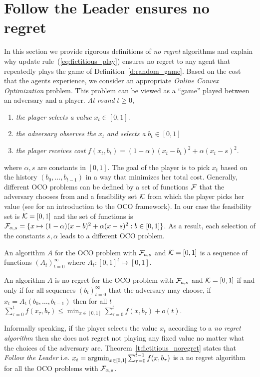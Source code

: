 \section{Follow the Leader ensures no regret}\label{s:fictitious_noregret}

In this section we provide rigorous definitions of \emph{no regret} algorithms
and explain why update rule~(\ref{eq:fictitious_play}) ensures
no regret to any agent that repeatedly plays the game of
Definition~\ref{d:random_game}.
Based on the cost that the agents experience,
we consider an appropriate \emph{Online Convex Optimization} problem.
This problem can be viewed as a \enquote{game} played between an
adversary and a player. \emph{At round }$t\geq 0$,
\begin{enumerate}
  \item \emph{the player selects a value }$x_t \in [0,1]$.
  \item \emph{the adversary observes the }$x_t$ \emph{and selects a} $b_t \in [0,1]$
  \item \emph{the player receives cost} $f(x_t,b_t)=(1-\alpha)(x_t-b_t)^2 + \alpha(x_t -s)^2$.
\end{enumerate}
where $\alpha,s$ are constants in $[0,1]$. The goal of
the player is to pick $x_t$ based on the history
$(b_0,\ldots,b_{t-1})$ in a way that minimizes her total cost.
Generally, different OCO problems can be defined by a set of functions
$\mathcal{F}$ that the adversary chooses from and a feasibility
set $\mathcal{K}$ from which the player picks her value (see \cite{Haz16}
for an introduction to the OCO framework).
In our case the feasibility set is $\mathcal{K}=[0,1]$ and the set of functions
is
$\mathcal{F}_{\alpha,s} = \{x \mapsto (1-\alpha)(x-b)^2 + \alpha(x -s)^2 : b \in [0,1]\}$.
As a result, each selection of the
constants $s,\alpha$ leads to a different OCO problem.

\begin{definition}\label{d:OCO_algo}
An algorithm $A$ for the OCO problem with $\mathcal{F}_{a,s}$ and
$\mathcal{K}=[0,1]$ is a sequence of functions $(A_t)_{t=0}^\infty$ where $A_t:[0,1]^t \mapsto [0,1]$.
\end{definition}

\begin{definition}\label{d:no_regret_algo}
An algorithm $A$ is no regret for the OCO problem with $\mathcal{F}_{a,s}$ and
$\mathcal{K}=[0,1]$ if and only if for all sequences $(b_t)_{t=0}^\infty$ that the
adversary may choose, if $x_t = A_t(b_0,\dots,b_{t-1})$ then for all $t$
\(\sum_{\tau=0}^t f(x_\tau,b_\tau)  \leq \min_{x \in [0,1]}\sum_{\tau=0}^t f(x,b_\tau) + o(t).\)
\end{definition}
Informally speaking, if the player selects the value
$x_t$ according to a \emph{no regret algorithm} then
she does not regret not playing any fixed value no
matter what the choices of the adversary are.
Theorem~\ref{t:fictitious_noregret} states that
\emph{Follow the Leader} i.e. $x_t = \operatorname*{argmin}_{x \in [0,1]}\sum_{\tau=0}^{t-1}f(x,b_\tau)$
is a no regret algorithm for all the OCO problems with $\mathcal{F}_{\alpha,s}$.

